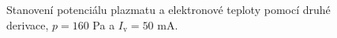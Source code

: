 \documentclass[a4paper,12pt]{article}
\begin{document}
\newpage
\begin{figure}[h]
	\centering
	\begin{subfigure}[b]{.49\textwidth}
		\centering
	\end{subfigure}
	\begin{subfigure}[b]{.49\textwidth}
		\centering
	\end{subfigure}
	\caption{Stanovení potenciálu plazmatu a elektronové teploty pomocí druhé 
	derivace, $p = 160$ 
	\si{\pascal} a $I_\text{v} = 50$ \si{\milli\ampere}.}
	\label{data2sec}
\end{figure}
\end{document}
